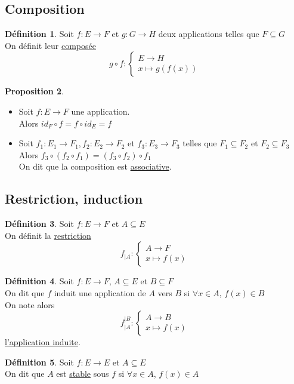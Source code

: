 \documentclass[10pt,a4paper]{article}
\theoremstyle{definition}
\newtheorem{proposition}{Proposition}[section]
\newtheorem{definition}[proposition]{Définition}
\begin{document}
\subsection{Composition}
\begin{definition}
Soit $f: E \to F$ et $g: G \to H$ deux applications telles que $F \subseteq G$ \\
On définit leur \uline{composée}
\[ g \circ f: \begin{cases}
E \to H \\
x \mapsto g(f(x))
\end{cases} \]
\end{definition}
\begin{proposition}
\hfill
\begin{itemize}
\item Soit $f: E \to F$ une application. \\
Alors $id_F \circ f = f \circ id_E = f$
\item Soit $f_1: E_1 \to F_1, f_2: E_2 \to F_2$ et $f_3: E_3 \to F_3$ telles que $F_1 \subseteq F_2$ et $F_2 \subseteq F_3$ \\
Alors $f_3 \circ (f_2 \circ f_1) = (f_3 \circ f_2) \circ f_1$ \\
On dit que la composition est \uline{associative}.
\end{itemize}
\end{proposition}

\subsection{Restriction, induction}
\begin{definition}
Soit $f: E \to F$ et $A \subseteq E$ \\
On définit la \uline{restriction}
\[ f_{|A}: \begin{cases}
A \to F \\
x \mapsto f(x)
\end{cases} \]
\end{definition}
\begin{definition}
Soit $f: E \to F$, $A \subseteq E$ et $B \subseteq F$ \\
On dit que $f$ induit une application de $A$ vers $B$ si $\forall x \in A$, $f(x) \in B$ \\
On note alors
\[ f_{|A}^{|B}: \begin{cases}
A \to B \\
x \mapsto f(x)
\end{cases} \]
\uline{l'application induite}.
\end{definition}
\begin{definition}
Soit $f: E \to E$ et $A \subseteq E$ \\
On dit que $A$ est \uline{stable} sous $f$ si $\forall x \in A$, $f(x) \in A$
\end{definition}
\end{document}
